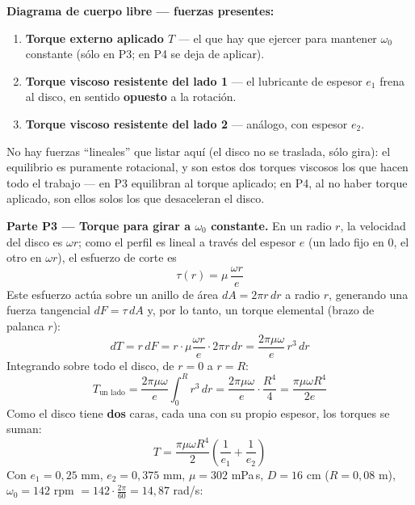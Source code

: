 \documentclass[11pt]{article}
\newenvironment{dcl}{%
  \noindent\textbf{Diagrama de cuerpo libre --- fuerzas presentes:}
  \begin{enumerate}[leftmargin=1.6em, itemsep=2pt, label=\arabic*.]
}{%
  \end{enumerate}
}
\begin{document}
\begin{dcl}
\item \textbf{Torque externo aplicado $T$} --- el que hay que ejercer para mantener
$\omega_0$ constante (s\'olo en P3; en P4 se deja de aplicar).
\item \textbf{Torque viscoso resistente del lado 1} --- el lubricante de espesor $e_1$
frena al disco, en sentido \textbf{opuesto} a la rotaci\'on.
\item \textbf{Torque viscoso resistente del lado 2} --- an\'alogo, con espesor $e_2$.
\end{dcl}
No hay fuerzas ``lineales'' que listar aqu\'i (el disco no se traslada, s\'olo gira): el
equilibrio es puramente rotacional, y son estos dos torques viscosos los que hacen todo
el trabajo --- en P3 equilibran al torque aplicado; en P4, al no haber torque aplicado,
son ellos solos los que desaceleran el disco.

\textbf{Parte P3 --- Torque para girar a $\omega_0$ constante.}
En un radio $r$, la velocidad del disco es $\omega r$; como el perfil es lineal a
trav\'es del espesor $e$ (un lado fijo en $0$, el otro en $\omega r$), el esfuerzo de
corte es
\begin{equation}
\tau(r)=\mu\,\frac{\omega r}{e}
\end{equation}
Este esfuerzo act\'ua sobre un anillo de \'area $dA=2\pi r\,dr$ a radio $r$, generando
una fuerza tangencial $dF=\tau\,dA$ y, por lo tanto, un torque elemental (brazo de
palanca $r$):
\begin{equation}
dT=r\,dF=r\cdot\mu\frac{\omega r}{e}\cdot2\pi r\,dr=\frac{2\pi\mu\omega}{e}\,r^3\,dr
\end{equation}
Integrando sobre todo el disco, de $r=0$ a $r=R$:
\begin{equation}
T_{\text{un lado}}=\frac{2\pi\mu\omega}{e}\int_0^R r^3\,dr
=\frac{2\pi\mu\omega}{e}\cdot\frac{R^4}{4}=\frac{\pi\mu\omega R^4}{2e}
\end{equation}
Como el disco tiene \textbf{dos} caras, cada una con su propio espesor, los torques se
suman:
\begin{equation}
\boxed{T=\frac{\pi\mu\omega R^4}{2}\left(\frac1{e_1}+\frac1{e_2}\right)}
\end{equation}
Con $e_1=0{,}25$ mm, $e_2=0{,}375$ mm, $\mu=302$ mPa\,s, $D=16$ cm ($R=0{,}08$ m),
$\omega_0=142$ rpm $=142\cdot\frac{2\pi}{60}=14{,}87$ rad/s:
\begin{center}
\end{center}
\end{document}
